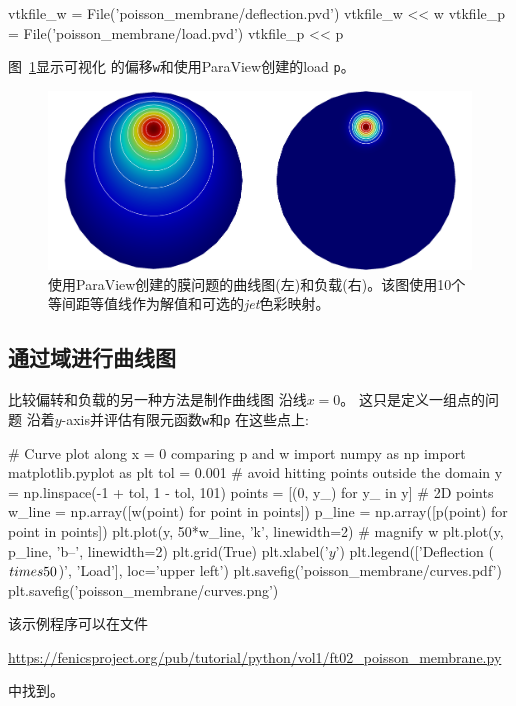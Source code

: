 \begin{python}
vtkfile_w = File('poisson_membrane/deflection.pvd')
vtkfile_w << w
vtkfile_p = File('poisson_membrane/load.pvd')
vtkfile_p << p
\end{python}
图~\ref{fig:poisson_membrane_deflection_load}显示可视化
的偏移\texttt{w}和使用ParaView创建的load \texttt{p}。

\begin{figure}[!ht]  %
 \centerline{\includegraphics[width=0.95\linewidth]{fig/poisson_membrane_deflection_load.png}}
 \caption{
 使用ParaView创建的膜问题的曲线图(左)和负载(右)。该图使用10个等间距等值线作为解值和可选的\emph{jet}色彩映射。\label{fig:poisson_membrane_deflection_load}
 }
\end{figure}

\subsection{通过域进行曲线图}


比较偏转和负载的另一种方法是制作曲线图
沿线$x=0$。 这只是定义一组点的问题
沿着$y$-axis并评估有限元函数\texttt{w}和\texttt{p}
在这些点上:

\begin{python}
# Curve plot along x = 0 comparing p and w
import numpy as np
import matplotlib.pyplot as plt
tol = 0.001  # avoid hitting points outside the domain
y = np.linspace(-1 + tol, 1 - tol, 101)
points = [(0, y_) for y_ in y]  # 2D points
w_line = np.array([w(point) for point in points])
p_line = np.array([p(point) for point in points])
plt.plot(y, 50*w_line, 'k', linewidth=2)  # magnify w
plt.plot(y, p_line, 'b--', linewidth=2)
plt.grid(True)
plt.xlabel('$y$')
plt.legend(['Deflection ($\\times 50$)', 'Load'], loc='upper left')
plt.savefig('poisson_membrane/curves.pdf')
plt.savefig('poisson_membrane/curves.png')
\end{python}
该示例程序可以在文件
\begin{center}
  \url{https://fenicsproject.org/pub/tutorial/python/vol1/ft02_poisson_membrane.py}
\end{center}
中找到。


